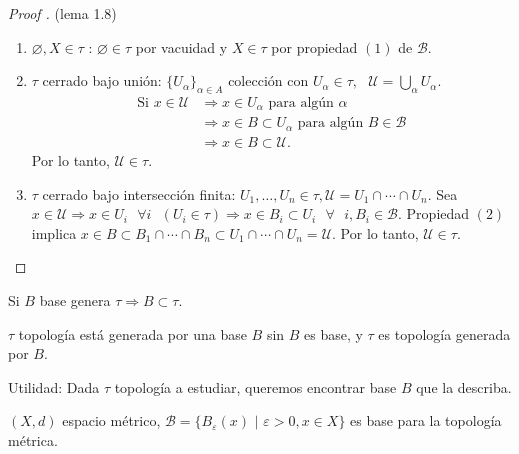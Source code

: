 \documentclass[a4paper]{report}
\begin{document}
	\begin{proof}[Proof ] (lema 1.8)
		\begin{enumerate}
			\item $\varnothing, X \in \tau \text{ : } \varnothing \in \tau$ por vacuidad y $X \in \tau$ por propiedad $(1)$ de $\mathcal{B}$.

			\item $\tau$ cerrado bajo unión: $\{ U_{\alpha} \}_{\alpha \in A}$ colección con $U_{\alpha} \in \tau, \text{ } \mathcal{U} = \bigcup_{\alpha} U_{\alpha}$.
			\begin{align*}
				\text{Si } x \in \mathcal{U} & \Rightarrow x \in U_{\alpha} \text{ para algún } \alpha \\
				& \Rightarrow x \in B \subset U_{\alpha} \text{ para algún } B \in \mathcal{B} \\
				& \Rightarrow x \in B \subset \mathcal{U}.
			\end{align*}
			Por lo tanto, $\mathcal{U} \in \tau$.

			\item $\tau$ cerrado bajo intersección finita: $U_1,\dots,U_n \in \tau, \mathcal{U} = U_1 \cap \cdots \cap U_n$. Sea $x \in \mathcal{U} \Rightarrow x \in U_i \text{ } \forall i \text{ } (U_i \in \tau) \Rightarrow x \in B_i \subset U_i \text{ } \forall \text{ } i, B_i \in \mathcal{B}$. Propiedad $(2)$ implica $x \in B \subset B_1 \cap \cdots \cap B_n \subset U_1 \cap \cdots \cap U_n = \mathcal{U}$. Por lo tanto, $\mathcal{U} \in \tau$.
		\end{enumerate}
	\end{proof}

	\begin{note}
		Si $B$ base genera $\tau \Rightarrow B \subset \tau$.
	\end{note}

	\begin{definition}
		$\tau$ topología está generada por una base $B$ sin $B$ es base, y $\tau$ es topología generada por $B$.
	\end{definition}

	Utilidad: Dada $\tau$ topología a estudiar, queremos encontrar base $B$ que la describa.

	\begin{eg}
		$(X,d)$ espacio métrico, $\mathcal{B} = \{ B_{\varepsilon} (x) \text{ | } \varepsilon > 0, x \in X \}$ es base para la topología métrica.  
	\end{eg}
\end{document}
